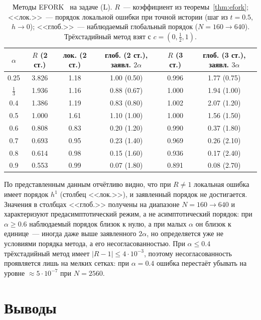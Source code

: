 \documentclass[11pt,a4paper]{article}
\theoremstyle{plain}
\theoremstyle{definition}
\begin{document}
\begin{table}[ht]
\centering\small
\caption{Методы EFORK~\cite{Ghaffari2023} на задаче (L). $R$~--- коэффициент из теоремы~\ref{thm:efork}; <<лок.>>~--- порядок локальной ошибки при точной истории (шаг из $t=0.5$, $h\to0$); <<глоб.>>~--- наблюдаемый глобальный порядок ($N=160\to640$). Трёхстадийный метод взят с $c=(0,\frac12,1)$.}\label{tab:efork}
\begin{tabular}{cccccc}
\toprule
$\alpha$ & $R$ (2 ст.) & лок. (2 ст.) & глоб. (2 ст.), заявл. $2\alpha$ & $R$ (3 ст.) & глоб. (3 ст.), заявл. $3\alpha$\\
\midrule
0.25 & 3.826 & 1.18 & 1.00 \;(0.50) & 0.996 & 1.77 \;(0.75)\\
$\frac13$ & 1.936 & 1.16 & 0.88 \;(0.67) & 1.000 & 1.94 \;(1.00)\\
0.4 & 1.386 & 1.19 & 0.83 \;(0.80) & 1.002 & 2.07 \;(1.20)\\
0.5 & 1.000 & 1.61 & 1.10 \;(1.00) & 1.000 & 1.56 \;(1.50)\\
0.6 & 0.808 & 0.83 & 0.20 \;(1.20) & 0.990 & 0.37 \;(1.80)\\
0.7 & 0.693 & 0.95 & 0.23 \;(1.40) & 0.969 & 0.26 \;(2.10)\\
0.8 & 0.614 & 0.98 & 0.15 \;(1.60) & 0.936 & 0.17 \;(2.40)\\
0.9 & 0.553 & 0.99 & 0.07 \;(1.80) & 0.891 & 0.08 \;(2.70)\\
\bottomrule
\end{tabular}
\end{table}

По представленным данным отчётливо видно, что при $R\ne1$ локальная ошибка имеет порядок $h^1$ (столбец <<лок.>>), и заявленный порядок не достигается. Значения в столбцах <<глоб.>> получены на диапазоне $N=160\to640$ и характеризуют предасимптотический режим, а не асимптотический порядок: при $\alpha\ge0.6$ наблюдаемый порядок близок к нулю, а при малых $\alpha$ он близок к единице~--- иногда даже выше заявленного $2\alpha$, но определяется уже не условиями порядка метода, а его несогласованностью. При $\alpha\le0.4$ трёхстадийный метод имеет $|R-1|\le4\cdot10^{-3}$, поэтому несогласованность проявляется лишь на мелких сетках: при $\alpha=0.4$ ошибка перестаёт убывать на уровне $\approx5\cdot10^{-7}$ при $N=2560$.

\section{Выводы}
\end{document}
